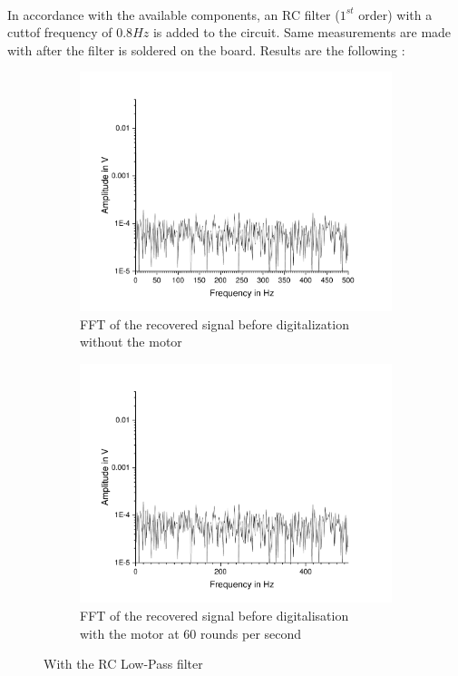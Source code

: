 \documentclass{article}[12pt]
\begin{document}
\paragraph{}
In accordance with the available components, an RC filter ($1^{st}$ order) with a cuttof frequency of $0.8Hz$ is added to the circuit. Same measurements are made with after the filter is soldered on the board. Results are the following : 
\begin{figure}[H]
\centering
\begin{subfigure}{.5\textwidth}
  \centering
  \includegraphics[width=\linewidth]{figures/nomotorfilter.pdf}
  \caption{FFT of the recovered signal before digitalization\\ without the motor}
  \label{fig:nomotornofilter2}
\end{subfigure}%
\begin{subfigure}{.5\textwidth}
  \centering
  \includegraphics[width=\linewidth]{figures/motorfilter.pdf}
  \caption{FFT of the recovered signal before digitalisation\\ with the motor at 60 rounds per second}
  \label{fig:motornofilter2}
\end{subfigure}
\caption{With the RC Low-Pass filter}
\label{fig:filterFFT}
\end{figure}
\end{document}
